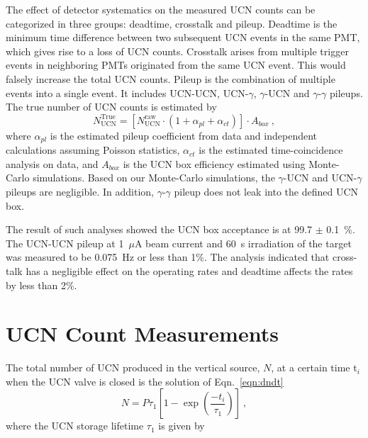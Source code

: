 The effect of detector systematics on the measured UCN counts can be
categorized in three groups: deadtime, crosstalk and pileup. Deadtime
is the minimum time difference between two subsequent UCN events in
the same PMT, which gives rise to a loss of UCN counts. Crosstalk
arises from multiple trigger events in neighboring PMTs originated
from the same UCN event. This would falsely increase the total UCN
counts. Pileup is the combination of multiple events into a single
event. It includes UCN-UCN, UCN-$\gamma$, $\gamma$-UCN and
$\gamma$-$\gamma$ pileups. The true number of UCN counts is estimated
by
\begin{equation}
  \label{eqn:trueUCN}
  N^{\mathrm{True}}_{\mathrm{UCN}} = \left [ N^{\mathrm{raw}}_{\mathrm{UCN}} \cdot \left( 1 + \alpha_{pl} + \alpha_{ct}\right) \right] \cdot A_{box}~,
\end{equation}
where $\alpha_{pl}$ is the estimated pileup coefficient from data and
independent calculations assuming Poisson statistics, $\alpha_{ct}$ is
the estimated time-coincidence analysis on data, and $A_{box}$ is the
UCN box efficiency estimated using Monte-Carlo simulations. Based on
our Monte-Carlo simulations, the $\gamma$-UCN and UCN-$\gamma$ pileups
are negligible. In addition, $\gamma$-$\gamma$ pileup does not leak
into the defined UCN box.

The result of such analyses showed the UCN box acceptance is at 99.7
$\pm$ 0.1~\%. The UCN-UCN pileup at 1~$\mu$A beam current and 60~s
irradiation of the target was measured to be 0.075~Hz or less than
1\%. The analysis indicated that cross-talk has a negligible effect on
the operating rates and deadtime affects the rates by less than 2\%.



\section{UCN Count Measurements \label{UCNCounts}}

The total number of UCN produced in the vertical source, $N$, at a
certain time t$_i$ when the UCN valve is closed is the solution of
Eqn.~\ref{eqn:dndt}
\begin{equation}
  \label{eq:totalUCN}
  N = P \tau_1\left[ 1- \exp \left(\frac{-t_i }{ \tau_1}\right) \right]~,
\end{equation}
where the UCN storage lifetime $\tau_1$ is given by

